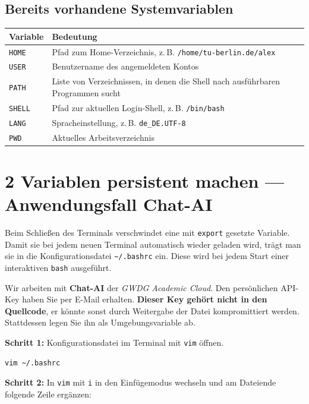 \documentclass[ngerman,11pt]{article}
\begin{document}
\subsection*{Bereits vorhandene Systemvariablen}

\begin{center}
\begin{tabular}{|l|p{11cm}|}
\hline
\textbf{Variable} & \textbf{Bedeutung} \\
\hline
\texttt{HOME}  & Pfad zum Home-Verzeichnis, z.\,B. \texttt{/home/tu-berlin.de/alex} \\
\texttt{USER}  & Benutzername des angemeldeten Kontos \\
\texttt{PATH}  & Liste von Verzeichnissen, in denen die Shell nach ausführbaren Programmen sucht \\
\texttt{SHELL} & Pfad zur aktuellen Login-Shell, z.\,B. \texttt{/bin/bash} \\
\texttt{LANG}  & Spracheinstellung, z.\,B. \texttt{de\_DE.UTF-8} \\
\texttt{PWD}   & Aktuelles Arbeitsverzeichnis \\
\hline
\end{tabular}
\end{center}

\section*{2 Variablen persistent machen --- Anwendungsfall Chat-AI}

Beim Schließen des Terminals verschwindet eine mit \texttt{export} gesetzte Variable. Damit sie bei jedem neuen Terminal automatisch wieder geladen wird, trägt man sie in die Konfigurationsdatei \texttt{\textasciitilde/.bashrc} ein. Diese wird bei jedem Start einer interaktiven \texttt{bash} ausgeführt.

\smallskip
Wir arbeiten mit \textbf{Chat-AI} der \emph{GWDG Academic Cloud}. Den persönlichen API-Key haben Sie per E-Mail erhalten. \textbf{Dieser Key gehört nicht in den Quellcode}, er könnte sonst durch Weitergabe der Datei kompromittiert werden. Stattdessen legen Sie ihn als Umgebungsvariable ab.

\smallskip
\noindent \textbf{Schritt 1:} Konfigurationsdatei im Terminal mit \texttt{vim} öffnen.

\begin{lstlisting}[style=bash]
vim ~/.bashrc
\end{lstlisting}

\noindent \textbf{Schritt 2:} In \texttt{vim} mit \texttt{i} in den Einfügemodus wechseln und am Dateiende folgende Zeile ergänzen:
\end{document}

